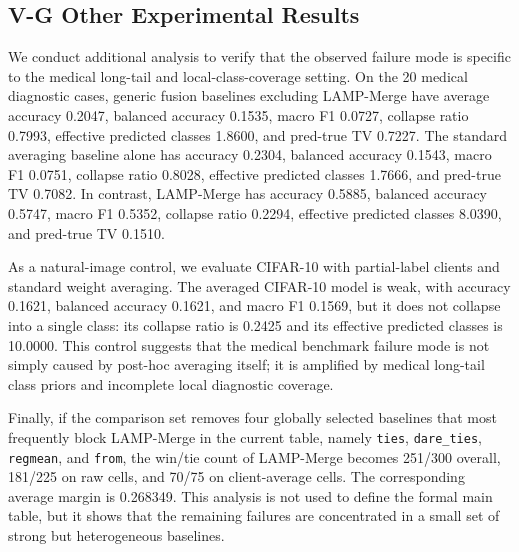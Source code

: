 \subsection{V-G Other Experimental Results}
We conduct additional analysis to verify that the observed failure mode is specific to the medical long-tail and local-class-coverage setting. On the 20 medical diagnostic cases, generic fusion baselines excluding LAMP-Merge have average accuracy 0.2047, balanced accuracy 0.1535, macro F1 0.0727, collapse ratio 0.7993, effective predicted classes 1.8600, and pred-true TV 0.7227. The standard averaging baseline alone has accuracy 0.2304, balanced accuracy 0.1543, macro F1 0.0751, collapse ratio 0.8028, effective predicted classes 1.7666, and pred-true TV 0.7082. In contrast, LAMP-Merge has accuracy 0.5885, balanced accuracy 0.5747, macro F1 0.5352, collapse ratio 0.2294, effective predicted classes 8.0390, and pred-true TV 0.1510.

As a natural-image control, we evaluate CIFAR-10 with partial-label clients and standard weight averaging. The averaged CIFAR-10 model is weak, with accuracy 0.1621, balanced accuracy 0.1621, and macro F1 0.1569, but it does not collapse into a single class: its collapse ratio is 0.2425 and its effective predicted classes is 10.0000. This control suggests that the medical benchmark failure mode is not simply caused by post-hoc averaging itself; it is amplified by medical long-tail class priors and incomplete local diagnostic coverage.

Finally, if the comparison set removes four globally selected baselines that most frequently block LAMP-Merge in the current table, namely \texttt{ties}, \texttt{dare\_ties}, \texttt{regmean}, and \texttt{from}, the win/tie count of LAMP-Merge becomes 251/300 overall, 181/225 on raw cells, and 70/75 on client-average cells. The corresponding average margin is 0.268349. This analysis is not used to define the formal main table, but it shows that the remaining failures are concentrated in a small set of strong but heterogeneous baselines.
